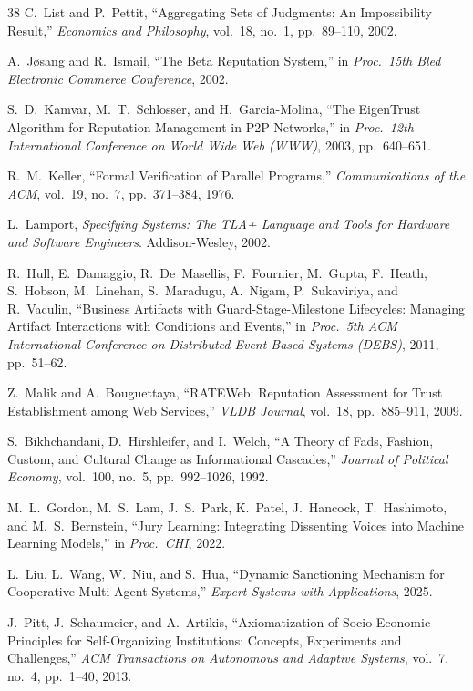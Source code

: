 \documentclass[11pt]{article}
\begin{document}
\begin{thebibliography}{38}
C.~List and P.~Pettit, ``Aggregating Sets of Judgments: An Impossibility Result,'' \textit{Economics and Philosophy}, vol.~18, no.~1, pp.~89--110, 2002.

A.~J{\o}sang and R.~Ismail, ``The Beta Reputation System,'' in \textit{Proc.\ 15th Bled Electronic Commerce Conference}, 2002.

S.~D.~Kamvar, M.~T.~Schlosser, and H.~Garcia-Molina, ``The EigenTrust Algorithm for Reputation Management in P2P Networks,'' in \textit{Proc.\ 12th International Conference on World Wide Web (WWW)}, 2003, pp.~640--651.

R.~M.~Keller, ``Formal Verification of Parallel Programs,'' \textit{Communications of the ACM}, vol.~19, no.~7, pp.~371--384, 1976.

L.~Lamport, \textit{Specifying Systems: The TLA+ Language and Tools for Hardware and Software Engineers}. Addison-Wesley, 2002.

R.~Hull, E.~Damaggio, R.~De~Masellis, F.~Fournier, M.~Gupta, F.~Heath, S.~Hobson, M.~Linehan, S.~Maradugu, A.~Nigam, P.~Sukaviriya, and R.~Vaculin, ``Business Artifacts with Guard-Stage-Milestone Lifecycles: Managing Artifact Interactions with Conditions and Events,'' in \textit{Proc.\ 5th ACM International Conference on Distributed Event-Based Systems (DEBS)}, 2011, pp.~51--62.

Z.~Malik and A.~Bouguettaya, ``RATEWeb: Reputation Assessment for Trust Establishment among Web Services,'' \textit{VLDB Journal}, vol.~18, pp.~885--911, 2009.

S.~Bikhchandani, D.~Hirshleifer, and I.~Welch, ``A Theory of Fads, Fashion, Custom, and Cultural Change as Informational Cascades,'' \textit{Journal of Political Economy}, vol.~100, no.~5, pp.~992--1026, 1992.

M.~L.~Gordon, M.~S.~Lam, J.~S.~Park, K.~Patel, J.~Hancock, T.~Hashimoto, and M.~S.~Bernstein, ``Jury Learning: Integrating Dissenting Voices into Machine Learning Models,'' in \textit{Proc.\ CHI}, 2022.

L.~Liu, L.~Wang, W.~Niu, and S.~Hua, ``Dynamic Sanctioning Mechanism for Cooperative Multi-Agent Systems,'' \textit{Expert Systems with Applications}, 2025.

J.~Pitt, J.~Schaumeier, and A.~Artikis, ``Axiomatization of Socio-Economic Principles for Self-Organizing Institutions: Concepts, Experiments and Challenges,'' \textit{ACM Transactions on Autonomous and Adaptive Systems}, vol.~7, no.~4, pp.~1--40, 2013.


\end{thebibliography}
\end{document}
